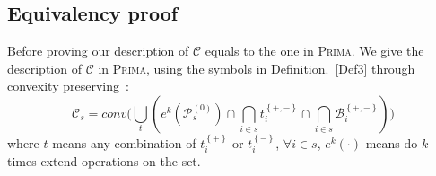 \documentclass[runningheads]{llncs}
\newcommand{\prima}{\textsc{Prima}\xspace}
\begin{document}
\subsection{Equivalency proof}\label{equivalency proof}
Before proving our description of $\mathcal{C}$ equals to the one in \prima. We give the description of $\mathcal{C}$ in \prima, using the symbols in Definition.~\ref{Def3} through convexity preserving~\cite{li1999convexity}:
\begin{equation}\label{prima C}
\mathcal{C}_{s} = conv\big( \bigcup_{t} ( e^{k}(\mathcal{P}_{s}^{(0)})\cap \bigcap_{i \in s}^{}t_{i}^{\left\{ +,-\right\}} \cap \bigcap_{i \in s}^{}\mathcal{B}_{i}^{\left\{ +,-\right\}} ) \big)
\end{equation}
where $t$ means any combination of $t_{i}^{\left\{ + \right\}}$ or $t_{i}^{\left\{ - \right\}}$, $\forall i \in s$, $e^{k}(\cdot)$ means do $k$ times extend operations on the set. 
\end{document}
